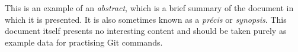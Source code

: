 This is an example of an \emph{abstract}, which is a brief summary of the document in which it is presented.
It is also sometimes known as a \emph{précis} or \emph{synopsis}.
This document itself presents no interesting content and should be taken purely as example data for practising Git commands.
